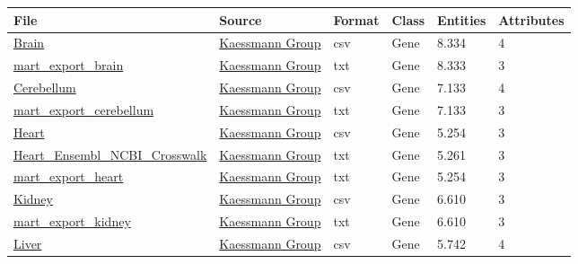 \documentclass{article}
\begin{document}
\begin{table}[!ht]
\centering
\setlength\extrarowheight{2pt} %
\begin{footnotesize}
\begin{tabularx}{\textwidth}{|l|l|l|l|l|l|}
\hline
\textbf{File} & \textbf{Source} & \textbf{Format} & \textbf{Class} & \textbf{Entities} & \textbf{Attributes} & \\ \hline
\href{https://nahorgebre.s3.amazonaws.com/Brain.csv}{Brain} & \href{https://www.zmbh.uni-heidelberg.de/kaessmann/}{Kaessmann Group}  & csv & Gene & 8.334 & 4 \\
\href{https://nahorgebre.s3.amazonaws.com/mart_export_brain.txt}{mart\_export\_brain} & \href{https://www.zmbh.uni-heidelberg.de/kaessmann/}{Kaessmann Group} & txt & Gene & 8.333 & 3 \\
\href{https://nahorgebre.s3.amazonaws.com/Cerebellum.csv}{Cerebellum} & \href{https://www.zmbh.uni-heidelberg.de/kaessmann/}{Kaessmann Group}  & csv & Gene & 7.133 & 4 \\
\href{https://nahorgebre.s3.amazonaws.com/mart_export_cerebellum.txt}{mart\_export\_cerebellum} & \href{https://www.zmbh.uni-heidelberg.de/kaessmann/}{Kaessmann Group} & txt & Gene & 7.133 & 3 \\
\href{https://nahorgebre.s3.amazonaws.com/Heart.csv}{Heart} & \href{https://www.zmbh.uni-heidelberg.de/kaessmann/}{Kaessmann Group}  & csv & Gene & 5.254 & 3 \\
\href{https://nahorgebre.s3.amazonaws.com/Heart_Ensembl_NCBI_Crosswalk.txt}{Heart\_Ensembl\_NCBI\_Crosswalk} & \href{https://www.zmbh.uni-heidelberg.de/kaessmann/}{Kaessmann Group} & txt & Gene & 5.261 & 3 \\
\href{https://nahorgebre.s3.amazonaws.com/mart_export_heart.txt}{mart\_export\_heart} & \href{https://www.zmbh.uni-heidelberg.de/kaessmann/}{Kaessmann Group} & txt & Gene & 5.254 & 3 \\
\href{https://nahorgebre.s3.amazonaws.com/Kidney.csv}{Kidney} & \href{https://www.zmbh.uni-heidelberg.de/kaessmann/}{Kaessmann Group}  & csv & Gene & 6.610 & 3 \\
\href{https://nahorgebre.s3.amazonaws.com/mart_export_kidney.txt}{mart\_export\_kidney} & \href{https://www.zmbh.uni-heidelberg.de/kaessmann/}{Kaessmann Group} & txt & Gene & 6.610 & 3 \\
\href{https://nahorgebre.s3.amazonaws.com/Liver.csv}{Liver} & \href{https://www.zmbh.uni-heidelberg.de/kaessmann/}{Kaessmann Group}  & csv & Gene & 5.742 & 4 \\

\end{tabularx}
\end{footnotesize}
\end{table}
\end{document}
